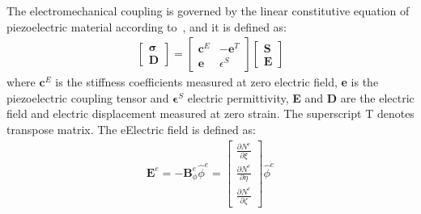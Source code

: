 \documentclass[a4paper,12pt]{article}
\begin{document}
{The electromechanical coupling is governed by the linear constitutive equation of piezoelectric material according to~\cite{giurgiutiumicromechatronics, rekatsinas2017cubic}, and it is defined as:
\begin{eqnarray}
\left [ 
\begin {array}{c}
\boldsymbol{\sigma}\\
\textbf{D}
\end{array}\right ]=
\left [ 
\begin{array}{cc}
\textbf{c}^E & -\textbf{e}^T \\
\textbf{e} & \epsilon^S 
\end{array} \right ]
\left[ 
\begin{array}{c}
\textbf{S}\\
\textbf{E} 
\end{array} \right ]
\end{eqnarray}
where \(\textbf{c}^E\) is the stiffness coefficients measured at zero electric field, \textbf{e} is the piezoelectric coupling tensor and \(\boldsymbol{\epsilon}^S\) electric permittivity, \textbf{E} and \textbf{D} are the electric field and electric displacement measured at zero strain.
The superscript T denotes transpose matrix.
The eElectric field is defined as:
\begin{eqnarray}
\textbf{E}^e=-\textbf{B}_\phi^e \widehat{\phi}^e = \left[ \begin{array}{c}
\frac{\partial N^e}{\partial \xi}\\
\frac{\partial N^e}{\partial \eta}\\
\frac{\partial N^e}{\partial \zeta}
\end{array} \right] \widehat{\phi}^e
\end{eqnarray}

}
\end{document}
